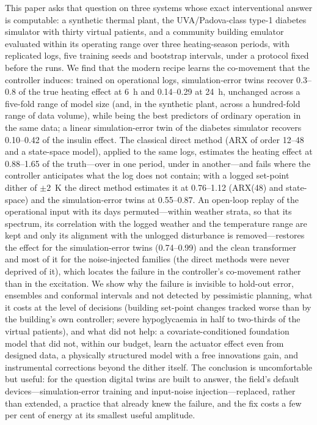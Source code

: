 \documentclass[11pt]{article}
\begin{document}
This paper asks that question on three systems whose exact interventional answer is computable: a synthetic thermal plant, the UVA/Padova-class type-1 diabetes simulator with thirty virtual patients, and a community building emulator evaluated within its operating range over three heating-season periods, with replicated logs, five training seeds and bootstrap intervals, under a protocol fixed before the runs. We find that the modern recipe learns the co-movement that the controller induces: trained on operational logs, simulation-error twins recover 0.3--0.8 of the true heating effect at 6~h and 0.14--0.29 at 24~h, unchanged across a five-fold range of model size (and, in the synthetic plant, across a hundred-fold range of data volume), while being the best predictors of ordinary operation in the same data; a linear simulation-error twin of the diabetes simulator recovers 0.10--0.42 of the insulin effect. The classical direct method (ARX of order 12--48 and a state-space model), applied to the same logs, estimates the heating effect at 0.88--1.65 of the truth---over in one period, under in another---and fails where the controller anticipates what the log does not contain; with a logged set-point dither of $\pm2$~K the direct method estimates it at 0.76--1.12 (ARX(48) and state-space) and the simulation-error twins at 0.55--0.87. An open-loop replay of the operational input with its days permuted---within weather strata, so that its spectrum, its correlation with the logged weather and the temperature range are kept and only its alignment with the unlogged disturbance is removed---restores the effect for the simulation-error twins (0.74--0.99) and the clean transformer and most of it for the noise-injected families (the direct methods were never deprived of it), which locates the failure in the controller's co-movement rather than in the excitation. We show why the failure is invisible to hold-out error, ensembles and conformal intervals and not detected by pessimistic planning, what it costs at the level of decisions (building set-point changes tracked worse than by the building's own controller; severe hypoglycaemia in half to two-thirds of the virtual patients), and what did not help: a covariate-conditioned foundation model that did not, within our budget, learn the actuator effect even from designed data, a physically structured model with a free innovations gain, and instrumental corrections beyond the dither itself. The conclusion is uncomfortable but useful: for the question digital twins \citep{strachan2016twin} are built to answer, the field's default devices---simulation-error training and input-noise injection---replaced, rather than extended, a practice that already knew the failure, and the fix costs a few per cent of energy at its smallest useful amplitude.
\end{document}
